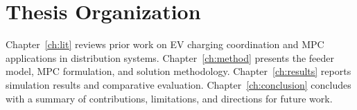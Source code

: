 \section{Thesis Organization}
Chapter~\ref{ch:lit} reviews prior work on EV charging coordination and MPC applications in
distribution systems. Chapter~\ref{ch:method} presents the feeder model, MPC formulation, and
solution methodology. Chapter~\ref{ch:results} reports simulation results and comparative
evaluation. Chapter~\ref{ch:conclusion} concludes with a summary of contributions, limitations,
and directions for future work.

